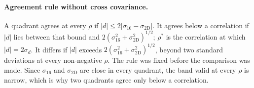 \paragraph{Agreement rule without cross covariance.} A quadrant agrees at every $\rho$ if $|d|\leq2|\sigma_{16}-\sigma_{\mathrm{2D}}|$. It agrees below a correlation if $|d|$ lies between that bound and $2(\sigma_{16}^2+\sigma_{\mathrm{2D}}^2)^{1/2}$; $\rho^{*}$ is the correlation at which $|d|=2\sigma_d$. It differs if $|d|$ exceeds $2(\sigma_{16}^2+\sigma_{\mathrm{2D}}^2)^{1/2}$, beyond two standard deviations at every non-negative $\rho$. The rule was fixed before the comparison was made. Since $\sigma_{16}$ and $\sigma_{\mathrm{2D}}$ are close in every quadrant, the band valid at every $\rho$ is narrow, which is why two quadrants agree only below a correlation.

